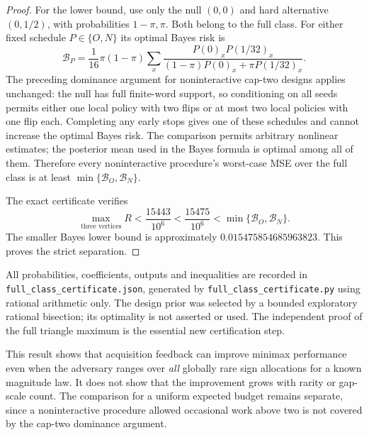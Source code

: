 \begin{proof}
For the lower bound, use only the null $(0,0)$ and hard alternative
$(0,1/2)$, with probabilities $1-\pi,\pi$. Both belong to the full class.
For either fixed schedule $P\in\{O,N\}$ its optimal Bayes risk is
\[
 \mathcal B_P=\frac1{16}\pi(1-\pi)\sum_x
 \frac{P(0)_xP(1/32)_x}{(1-\pi)P(0)_x+\pi P(1/32)_x}.
\]
The preceding dominance argument for noninteractive cap-two designs
applies unchanged: the null has full finite-word support, so conditioning
on all seeds permits either one local policy with two flips or at most two
local policies with one flip each. Completing any early stops gives one
of these schedules and cannot increase the optimal Bayes risk. The
comparison permits arbitrary nonlinear estimates; the posterior mean used
in the Bayes formula is optimal among all of them. Therefore every
noninteractive procedure's worst-case MSE over the full class is at least
$\min\{\mathcal B_O,\mathcal B_N\}$.

The exact certificate verifies
\[
 \max_{\text{three vertices}} R
 <\frac{15443}{10^6}<\frac{15475}{10^6}
 <\min\{\mathcal B_O,\mathcal B_N\}.
\]
The smaller Bayes lower bound is approximately
$0.015475854685963823$. This proves the strict separation.
\end{proof}

All probabilities, coefficients, outputs and inequalities are recorded in
\texttt{full\_class\_certificate.json}, generated by
\texttt{full\_class\_certificate.py} using rational arithmetic only.
The design prior was selected by a bounded exploratory rational bisection;
its optimality is not asserted or used. The independent proof of the full
triangle maximum is the essential new certification step.

This result shows that acquisition feedback can improve minimax performance
even when the adversary ranges over \emph{all} globally rare sign
allocations for a known magnitude law. It does not show that the improvement
grows with rarity or gap-scale count. The comparison for a uniform expected
budget remains separate, since a noninteractive procedure allowed occasional
work above two is not covered by the cap-two dominance argument.
